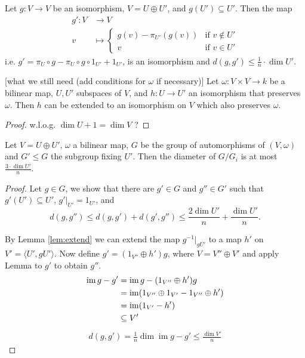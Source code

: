 \begin{lemma}
Let $g\colon V\to V$ be an isomorphism, $V=U\oplus U'$, and $g(U')\subseteq U'$. %
Then the map 
\begin{align*}
g'\colon V&\to V\\
v&\mapsto
\begin{cases}
g(v)-\pi_{U'}(g(v)) &\text{if }v\notin U'\\
v &\text{if }v\in U'
\end{cases}
\end{align*}
i.e. $g'=\pi_U\circ g-\pi_U\circ g \circ1_{U'} +1_{U'}$, is an isomorphism and $d(g,g')\leq \frac{1}{n}\cdot\dim U'$.
\end{lemma}


\begin{lemma}\label{lem:extend}[what we still need (add conditions for $\omega$ if necessary)]
Let $\omega\colon V\times V\to k$ be a bilinear map, $U,U'$ subspaces of $V$, and $h\colon U\to U'$ an isomorphism that preserves $\omega$. Then $h$ can be extended to an isomorphism on $V$ which also preserves $\omega$.
\end{lemma}
\begin{proof}
w.l.o.g. $\dim U+1= \dim V$ ?
\end{proof}


\begin{lemma}
Let $V=U\oplus U'$, $\omega$ a bilinear map, $G$ be the group of automorphisms of $(V,\omega)$ and $G'\leq G$ the subgroup fixing $U'$. Then the diameter of $G/G_i$ is at most $\frac{3\cdot\dim U'}{n}$.
\end{lemma}
\begin{proof}
Let $g\in G$, we show that there are $g'\in G$ and $g''\in G'$ such that $g'(U')\subseteq U'$, $g'|_{U'}=1_{U'}$, and
\[d(g,g'')\leq d(g,g')+d(g',g'')\leq \frac{2\dim U'}{n}+\frac{\dim U'}{n}.\]

By Lemma \ref{lem:extend} we can extend the map $g^{-1}|_{gU'}$ to a map $h'$ on $V'=\langle U',gU' \rangle$. Now define $g'=(1_{V''}\oplus h')g$, where $V=V''\oplus V'$ and apply Lemma to $g'$ to obtain $g''$.
\begin{align*}
\operatorname{im} g-g'&= \operatorname{im} g-(1_{V''}\oplus h')g\\
&=\operatorname{im} (1_{V''}\oplus 1_{V'}-1_{V''}\oplus h')\\
&=\operatorname{im} (1_{V'}-h')\\
&\subseteq V'	
\end{align*}
\begin{align*}
d(g,g')=\frac{1}{n}\dim \operatorname{im} g-g'\leq \frac{\dim V'}{n}
\end{align*}
\end{proof}

